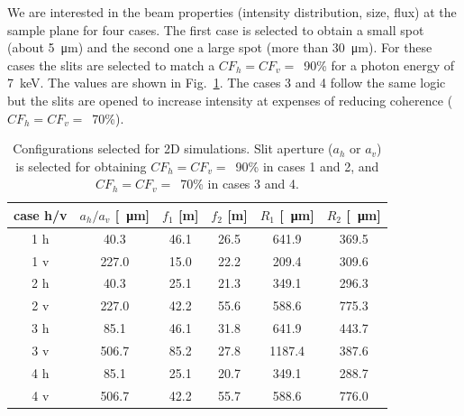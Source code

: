 \documentclass{iucr}              %
\begin{document}

We are interested in the beam properties (intensity distribution, size, flux) at the sample plane for four cases.
The first case is selected to obtain a small spot (about \SI{5}{\micro\meter}) and the second one a large spot (more than \SI{30}{\micro\meter}). For these cases the slits are selected to match a $CF_h=CF_v=$~90\% for a photon energy of \SI{7}{keV}. The values are shown in Fig.~\ref{table:2Dusercases}. The cases 3 and 4 follow the same logic but the slits are opened to increase intensity at expenses of reducing coherence  ($CF_h=CF_v=$~70\%). 


\begin{table}[]
    \label{table:2Dusercases}
    \caption{Configurations selected for 2D simulations. Slit aperture ($a_h$ or $a_v$) is selected for obtaining $CF_h=CF_v=$~90\% in cases 1 and 2, and $CF_h=CF_v=$~70\% in cases 3 and 4. 
    }
    \begin{tabular}{c|c|c|c|c|c}
         case h/v & $a_h/a_v$ [\SI{}{\micro\meter}] & $f_1$ [m] & $f_2$ [m] & $R_1$ [\SI{}{\micro\meter}]& $R_2$ [\SI{}{\micro\meter}] \\
         \hline
1 h &      40.3 & 46.1 &     26.5 &     641.9 &     369.5 
\\
1 v &      227.0 & 15.0 &     22.2 &     209.4 &     309.6 
\\
\hline
2 h &      40.3 & 25.1 &     21.3 &     349.1 &     296.3  
\\
2 v &      227.0 & 42.2 &     55.6 &     588.6 &     775.3 
\\
\hline \hline
3 h &      85.1 & 46.1 &     31.8 &     641.9 &     443.7 
\\
3 v &      506.7 & 85.2 &     27.8 &     1187.4 &     387.6  
\\
\hline
4 h &      85.1 & 25.1 &     20.7 &     349.1 &     288.7 
\\
4 v &      506.7 & 42.2 &     55.7 &     588.6 &     776.0 

    \end{tabular}
\end{table}
\end{document}
